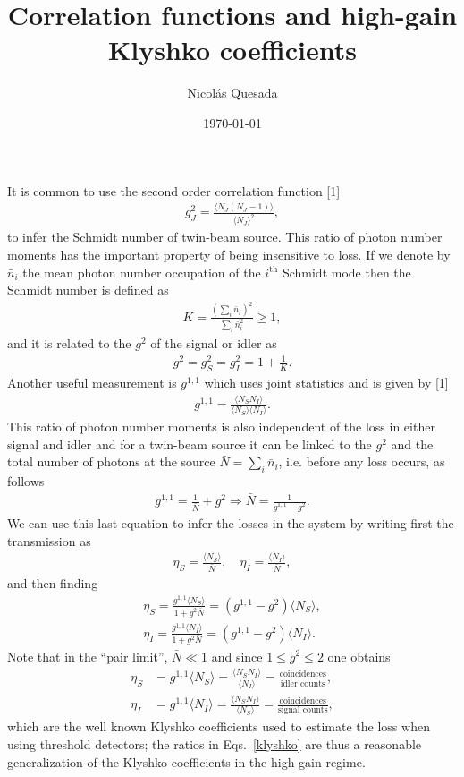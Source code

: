 \documentclass[aps,twocolumn,reprint,nofootinbib]{revtex4-1}
\newcommand{\braket}[1]{\langle #1 \rangle}
\newcommand{\eq}[1]{\begin{align}#1\end{align}}
\begin{document}
\title{Correlation functions and high-gain Klyshko coefficients}
\author{Nicol\'as Quesada}
\date{\today}
\maketitle
It is common to use the second order correlation function [1]
\eq{
g^2_{J} = \frac{\braket{N_{J}(N_J-1)}}{\braket{N_J}^2},
}
to infer the Schmidt number of twin-beam source. This ratio of photon number moments has the important property of being insensitive to loss. If we denote by $\bar{n}_i$ the mean photon number occupation of the $i^{\text{th}}$ Schmidt mode then the Schmidt number is defined as
\eq{
K = \frac{\left( \sum_i \bar{n}_i  \right)^2}{ \sum_i \bar{n}_i^2}	\geq 1,
}
and it is related to the $g^2$ of the signal or idler as
\eq{
g^2 = g^2_S = g^2_I = 1+\frac{1}{K}	.
}
Another useful measurement is $g^{1,1}$ which uses joint statistics and is given by [1]
\eq{
g^{1,1} = \frac{\braket{N_S N_I}}{\braket{N_S} \braket{N_I}}.
}
This ratio of photon number moments is also independent of the loss in either signal and idler and for a twin-beam source it can be linked to the $g^2$ and the total number of photons at the source $\bar{N} = \sum_{i} \bar{n}_i$, i.e. before any loss occurs, as follows
\eq{
g^{1,1} = \frac{1}{\bar N} + g^{2} \Longrightarrow \bar N  = \frac{1}{g^{1,1} - g^2}.
}
We can use this last equation to infer the losses in the system by writing first the transmission as
\eq{
\eta_S = \frac{\braket{N_S}}{\bar{N}}, \quad \eta_I = \frac{\braket{N_I}}{\bar{N}},
}
and then finding
\eq{\label{klyshko}
\eta_S = \frac{g^{1,1}	\braket{N_S}}{1+g^2 \bar{N}} =
 \left( g^{1,1} -g^2 \right) \braket{N_S},\\
\eta_I = \frac{g^{1,1}	\braket{N_I}}{1+g^2 \bar{N}} =
 \left( g^{1,1} -g^2 \right) \braket{N_I}.
}
Note that in the ``pair limit'', $\bar{N} \ll 1$ and since $1 \leq g^2 \leq 2$ one obtains
\eq{
\eta_S &= g^{1,1}	\braket{N_S} = \frac{\braket{N_S N_I}}{\braket{N_I}} = \frac{\text{coincidences}}{\text{idler counts}},	\\
\eta_I &= g^{1,1}	\braket{N_I} = \frac{\braket{N_S N_I}}{\braket{N_S}}	=\frac{\text{coincidences}}{\text{signal counts}},
}	
which are the well known Klyshko coefficients used to estimate the loss when using threshold detectors; the ratios in Eqs.~\eqref{klyshko} are thus a reasonable generalization of the Klyshko coefficients in the high-gain regime.
\end{document}
